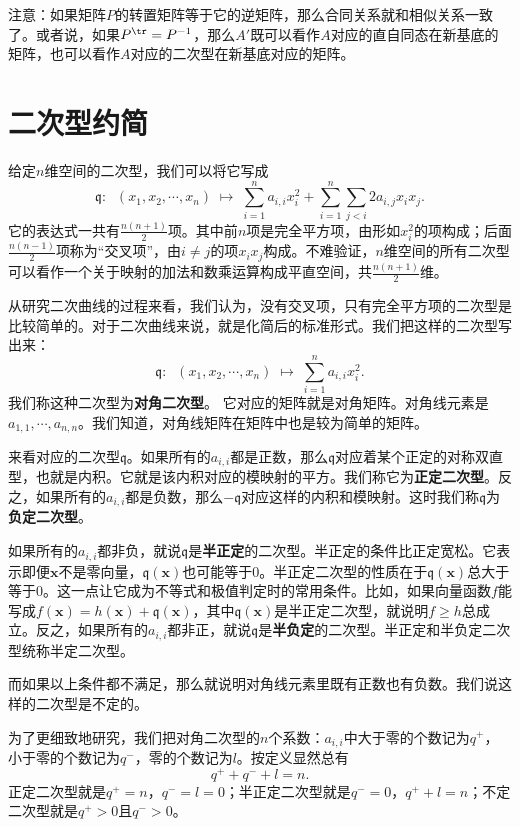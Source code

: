 \documentclass[12pt,UTF8,fontset=none]{ctexbook}
\begin{document}
注意：如果矩阵$P$的转置矩阵等于它的逆矩阵，那么合同关系就和相似关系一致了。或者说，如果$P^{\tr} = P^{-1}$，那么$A'$既可以看作$A$对应的直自同态在新基底的矩阵，也可以看作$A$对应的二次型在新基底对应的矩阵。

\section{二次型约简}
给定$n$维空间的二次型，我们可以将它写成
$$ \mathfrak{q}:\;\; (x_1, x_2, \cdots, x_n) \; \mapsto \; \sum_{i=1}^n a_{i,i} x_i^2 + \sum_{i=1}^n \sum_{j<i} 2a_{i,j} x_i x_j. $$
它的表达式一共有$\frac{n(n+1)}{2}$项。其中前$n$项是完全平方项，由形如$x_i^2$的项构成；后面$\frac{n(n-1)}{2}$项称为“交叉项”，由$i\neq j$的项$x_i x_j$构成。不难验证，$n$维空间的所有二次型可以看作一个关于映射的加法和数乘运算构成平直空间，共$\frac{n(n+1)}{2}$维。

从研究二次曲线的过程来看，我们认为，没有交叉项，只有完全平方项的二次型是比较简单的。对于二次曲线来说，就是化简后的标准形式。我们把这样的二次型写出来：
$$ \mathfrak{q}:\;\; (x_1, x_2, \cdots, x_n) \; \mapsto \; \sum_{i=1}^n a_{i,i} x_i^2 . $$
我们称这种二次型为\textbf{对角二次型}。
它对应的矩阵就是对角矩阵。对角线元素是$a_{1,1}, \cdots, a_{n,n}$。我们知道，对角线矩阵在矩阵中也是较为简单的矩阵。

来看对应的二次型$\mathfrak{q}$。如果所有的$a_{i,i}$都是正数，那么$\mathfrak{q}$对应着某个正定的对称双直型，也就是内积。它就是该内积对应的模映射的平方。我们称它为\textbf{正定二次型}。反之，如果所有的$a_{i,i}$都是负数，那么$-\mathfrak{q}$对应这样的内积和模映射。这时我们称$\mathfrak{q}$为\textbf{负定二次型}。

如果所有的$a_{i,i}$都非负，就说$\mathfrak{q}$是\textbf{半正定}的二次型。半正定的条件比正定宽松。它表示即便$\mathbf{x}$不是零向量，$\mathfrak{q}(\mathbf{x})$也可能等于$0$。半正定二次型的性质在于$\mathfrak{q}(\mathbf{x})$总大于等于$0$。这一点让它成为不等式和极值判定时的常用条件。比如，如果向量函数$f$能写成$f(\mathbf{x}) = h(\mathbf{x}) + \mathfrak{q}(\mathbf{x})$，其中$\mathfrak{q}(\mathbf{x})$是半正定二次型，就说明$f\geqslant h$总成立。反之，如果所有的$a_{i,i}$都非正，就说$\mathfrak{q}$是\textbf{半负定}的二次型。半正定和半负定二次型统称半定二次型。

而如果以上条件都不满足，那么就说明对角线元素里既有正数也有负数。我们说这样的二次型是不定的。

为了更细致地研究，我们把对角二次型的$n$个系数：$a_{i,i}$中大于零的个数记为$q^+$，小于零的个数记为$q^-$，零的个数记为$l$。按定义显然总有
$$ q^+ + q^- + l = n.$$
正定二次型就是$q^+ = n$，$q^- = l = 0$；半正定二次型就是$q^- = 0$，$q^+ + l = n$；不定二次型就是$q^+ > 0$且$q^- > 0$。
\end{document}
